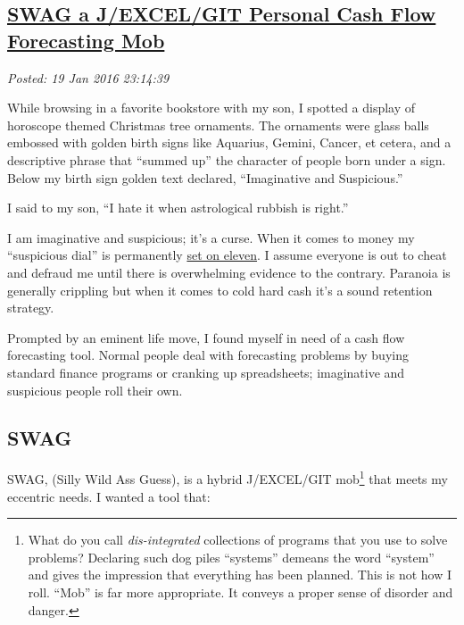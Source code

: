 %

\subsection*{\href{https://bakerjd99.wordpress.com/2016/01/10/swag-a-jexcelgit-personal-cash-flow-forecasting-mob/}{SWAG a J/EXCEL/GIT Personal Cash Flow Forecasting Mob}}

\noindent\emph{Posted: 19 Jan 2016 23:14:39}
\vspace{6pt}

While browsing in a favorite bookstore with my son, I spotted a display
of horoscope themed Christmas tree ornaments. The ornaments were glass
balls embossed with golden birth signs like Aquarius, Gemini, Cancer, et
cetera, and a descriptive phrase that ``summed up'' the character of
people born under a sign. Below my birth sign golden text declared,
``Imaginative and Suspicious.''

I said to my son, ``I hate it when astrological rubbish is right.''

I am imaginative and suspicious; it's a curse. When it comes to money my
``suspicious dial'' is permanently
\href{https://www.youtube.com/watch?v=4xgx4k83zzc}{set on eleven}. I
assume everyone is out to cheat and defraud me until there is
overwhelming evidence to the contrary. Paranoia is generally crippling
but when it comes to cold hard cash it's a sound retention strategy.

Prompted by an eminent life move, I found myself in need of a cash flow
forecasting tool. Normal people deal with forecasting problems by buying
standard finance programs or cranking up spreadsheets; imaginative and
suspicious people roll their own.

\subsection*{SWAG}\label{swag}

SWAG, (Silly Wild Ass Guess), is a hybrid J/EXCEL/GIT mob\footnote{What
  do you call \emph{dis-integrated} collections of programs that you use
  to solve problems? Declaring such dog piles ``systems'' demeans the
  word ``system'' and gives the impression that everything has been
  planned. This is not how I roll. ``Mob'' is far more appropriate. It
  conveys a proper sense of disorder and danger.} that meets my
eccentric needs. I wanted a tool that:

